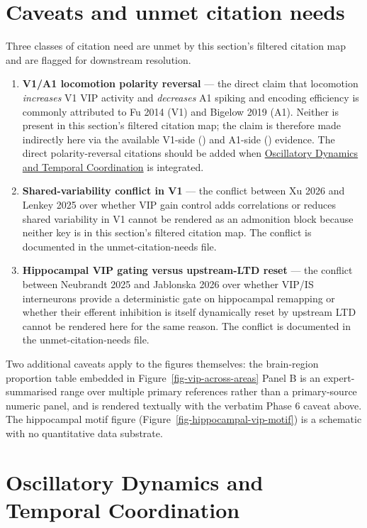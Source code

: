\documentclass[11pt]{article}
\begin{document}
\section{Caveats and unmet citation needs}

Three classes of citation need are unmet by this section's filtered citation map and are flagged for downstream resolution.

\begin{enumerate}
\item \textbf{V1/A1 locomotion polarity reversal} --- the direct claim that locomotion \textit{increases} V1 VIP activity and \textit{decreases} A1 spiking and encoding efficiency is commonly attributed to Fu 2014 (V1) and Bigelow 2019 (A1). Neither is present in this section's filtered citation map; the claim is therefore made indirectly here via the available V1-side (\citep{Dipoppa2018, Pakan2016}) and A1-side (\citep{Pi2013}) evidence. The direct polarity-reversal citations should be added when \href{/oscillatory-dynamics}{Oscillatory Dynamics and Temporal Coordination} is integrated.
\item \textbf{Shared-variability conflict in V1} --- the conflict between Xu 2026 and Lenkey 2025 over whether VIP gain control adds correlations or reduces shared variability in V1 cannot be rendered as an admonition block because neither key is in this section's filtered citation map. The conflict is documented in the unmet-citation-needs file.
\item \textbf{Hippocampal VIP gating versus upstream-LTD reset} --- the conflict between Neubrandt 2025 and Jablonska 2026 over whether VIP/IS interneurons provide a deterministic gate on hippocampal remapping or whether their efferent inhibition is itself dynamically reset by upstream LTD cannot be rendered here for the same reason. The conflict is documented in the unmet-citation-needs file.
\end{enumerate}

Two additional caveats apply to the figures themselves: the brain-region proportion table embedded in Figure~\ref{fig-vip-across-areas} Panel B is an expert-summarised range over multiple primary references rather than a primary-source numeric panel, and is rendered textually with the verbatim Phase 6 caveat above. The hippocampal motif figure (Figure~\ref{fig-hippocampal-vip-motif}) is a schematic with no quantitative data substrate.


\section{Oscillatory Dynamics and Temporal Coordination}
\label{sec:10_oscillatory_dynamics}
\end{document}
